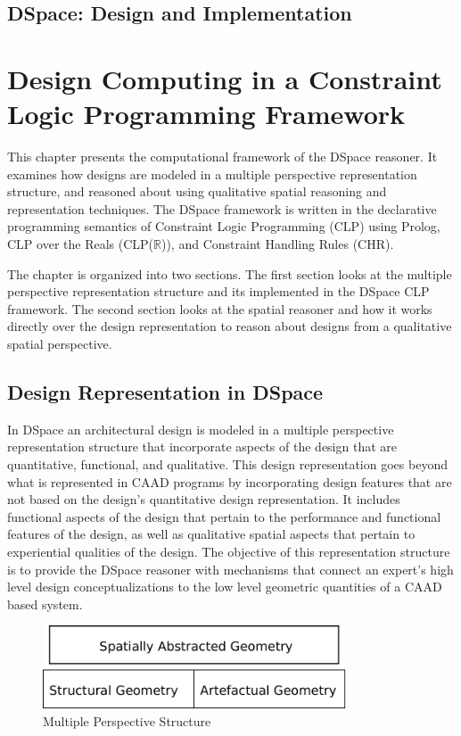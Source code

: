 \documentclass[12pt]{ucthesis}
\begin{document}
\section{DSpace: Design and Implementation}


\chapter{Design Computing in a Constraint Logic Programming Framework}
This chapter presents the computational framework of the DSpace reasoner. It examines how designs are modeled in a multiple perspective representation structure, and reasoned about using qualitative spatial reasoning and representation techniques. The DSpace framework is written in the declarative programming semantics of Constraint Logic Programming (CLP) using Prolog, CLP over the Reals (CLP($\mathbb{R}$)), and Constraint Handling Rules (CHR).  

The chapter is organized into two sections. The first section looks at the multiple perspective representation structure and its implemented in the DSpace CLP framework. The second section looks at the spatial reasoner and how it works directly over the design representation to reason about designs from a qualitative spatial perspective.

\section{Design Representation in DSpace}
In DSpace an architectural design is modeled in a multiple perspective representation structure that incorporate aspects of the design that are quantitative, functional, and qualitative. This design representation goes beyond what is represented in CAAD programs by incorporating design features that are not based on the design's quantitative design representation. It includes functional aspects of the design that pertain to the performance and functional features of the design, as well as qualitative spatial aspects that pertain to experiential qualities of the design. The objective of this representation structure is to provide the DSpace reasoner with mechanisms that connect an expert's high level design conceptualizations to the low level geometric quantities of a CAAD based system.   

\begin{figure}[H]
\centering
\includegraphics[width=90mm]{multi-persepective}
\caption{Multiple Perspective Structure}
\label{mutli-perspective}
\end{figure}
\end{document}
